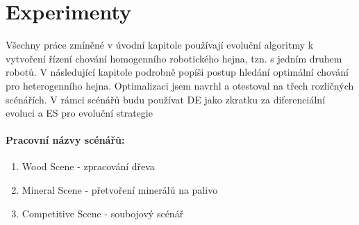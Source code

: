 \chapter{Experimenty}
\label{chap:experimenty}
Všechny práce zmíněné v úvodní kapitole používají evoluční algoritmy k vytvoření řízení chování homogenního robotického hejna, tzn. s jedním druhem robotů. V následující kapitole podrobně popíši postup hledání optimální chování pro heterogenního hejna. Optimalizaci jsem navrhl a otestoval na třech rozličných scénářích. V rámci scénářů budu používat DE jako zkratku za diferenciální evoluci a ES pro evoluční strategie
\par
\subsubsection{Pracovní názvy scénářů:}
\begin{enumerate}
	\item Wood Scene - zpracování dřeva
	\item Mineral Scene - přetvoření minerálů na palivo 
	\item Competitive Scene - soubojový scénář
\end{enumerate}

